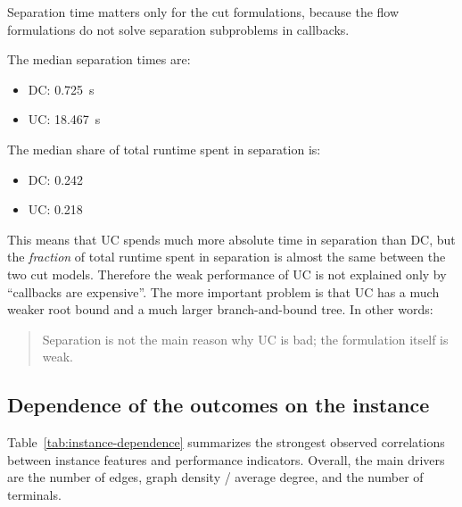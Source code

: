 Separation time matters only for the cut formulations, because the flow
formulations do not solve separation subproblems in callbacks.

The median separation times are:

\begin{itemize}
  \item DC: \SI{0.725}{s}
  \item UC: \SI{18.467}{s}
\end{itemize}

The median share of total runtime spent in separation is:

\begin{itemize}
  \item DC: 0.242
  \item UC: 0.218
\end{itemize}

This means that UC spends much more absolute time in
separation than DC, but the \emph{fraction} of total runtime spent in separation
is almost the same between the two cut models. Therefore the weak
performance of UC is not explained only by ``callbacks are expensive''.
The more important problem is that UC has a much weaker root bound and a much
larger branch-and-bound tree. In other words:

\begin{quote}
Separation is not the main reason why UC is bad; the formulation itself is weak.
\end{quote}

\subsection{Dependence of the outcomes on the instance}

Table~\ref{tab:instance-dependence} summarizes the strongest observed
correlations between instance features and performance indicators. Overall, the
main drivers are the number of edges, graph density / average degree, and the
number of terminals.

